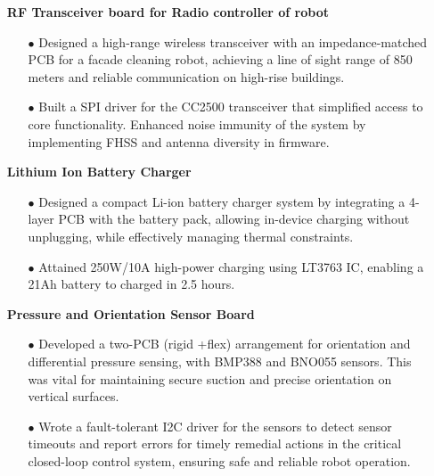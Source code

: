 \documentclass[a4,11pt]{article}
\begin{document}
      \begin{itemize}[leftmargin=0.01in]
        \item[]  \textbf{RF Transceiver board for Radio controller of robot}
            \begin{itemize}\setlength{\itemsep}{0pt}\setlength{\parskip}{0pt}\vspace{-0.3em}
                \item[$\bullet$] Designed a high-range wireless transceiver with an impedance-matched PCB for a facade cleaning robot, achieving a line of sight range of 850 meters and reliable communication on high-rise buildings.
                \item[$\bullet$] Built a  SPI driver for the CC2500 transceiver that simplified access to core functionality. Enhanced noise immunity of the system by implementing FHSS and antenna diversity in firmware.
            \end{itemize}
        \item[]  \textbf{Lithium Ion Battery Charger}
            \begin{itemize}\setlength{\itemsep}{0pt}\setlength{\parskip}{0pt}\vspace{-0.3em}
                \item[$\bullet$] Designed a compact Li-ion battery charger system by integrating a 4-layer PCB with the battery pack, allowing in-device charging without unplugging, while effectively managing thermal constraints. 
                \item[$\bullet$] Attained 250W/10A high-power charging using LT3763 IC, enabling a 21Ah battery to charged in 2.5 hours.
            \end{itemize}
        \item[]  \textbf{Pressure and Orientation Sensor Board}
            \begin{itemize}\setlength{\itemsep}{0pt}\setlength{\parskip}{0pt}\vspace{-0.3em}
                \item[$\bullet$] Developed a two-PCB (rigid +flex) arrangement for orientation and differential pressure sensing, with BMP388 and BNO055 sensors. This was vital for maintaining secure suction and precise orientation on vertical surfaces.
                \item[$\bullet$] Wrote a fault-tolerant I2C driver for the sensors to detect sensor timeouts and report errors for timely remedial actions in the critical closed-loop control system, ensuring safe and reliable robot operation.

\end{itemize}
\end{itemize}
\end{document}
